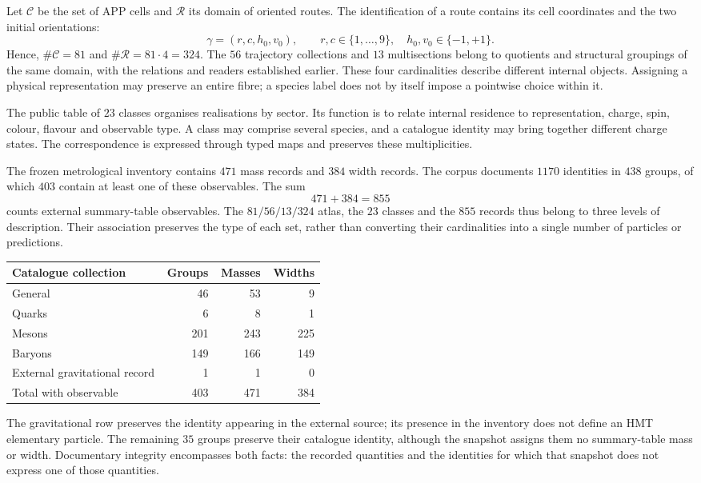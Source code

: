 Let \(\mathcal C\) be the set of APP cells and \(\mathcal R\) its domain
of oriented routes. The identification of a route contains its cell
coordinates and the two initial orientations:
\[
 \gamma=(r,c,h_0,v_0),\qquad
 r,c\in\{1,\ldots,9\},\quad h_0,v_0\in\{-1,+1\}.
\]
Hence, \(\#\mathcal C=81\) and \(\#\mathcal R=81\cdot4=324\).
The \(56\) trajectory collections and \(13\) multisections belong
to quotients and structural groupings of the same domain, with the
relations and readers established earlier. These four cardinalities
describe different internal objects. Assigning a physical
representation may preserve an entire fibre; a species label does not
by itself impose a pointwise choice within it.

The public table of \(23\) classes organises realisations by sector.
Its function is to relate internal residence to representation,
charge, spin, colour, flavour and observable type. A class may
comprise several species, and a catalogue identity may bring together
different charge states. The correspondence is expressed through
typed maps and preserves these multiplicities.

The frozen metrological inventory contains \(471\) mass records and
\(384\) width records. The corpus documents \(1170\) identities in \(438\)
groups, of which \(403\) contain at least one of these observables.
The sum
\[
 471+384=855
\]
counts external summary-table observables. The \(81/56/13/324\) atlas,
the \(23\) classes and the \(855\) records thus belong to three levels
of description. Their association preserves the type of each set, rather
than converting their cardinalities into a single number of particles or predictions.

\begin{center}
\begin{tabular}{p{0.49\linewidth}rrr}
\toprule
Catalogue collection & Groups & Masses & Widths\\
\midrule
General & 46 & 53 & 9\\
Quarks & 6 & 8 & 1\\
Mesons & 201 & 243 & 225\\
Baryons & 149 & 166 & 149\\
External gravitational record & 1 & 1 & 0\\
\midrule
Total with observable & 403 & 471 & 384\\
\bottomrule
\end{tabular}
\end{center}

The gravitational row preserves the identity appearing in the external source;
its presence in the inventory does not define an HMT elementary particle.
The remaining \(35\) groups preserve their catalogue identity, although
the snapshot assigns them no summary-table mass or width. Documentary
integrity encompasses both facts: the recorded quantities and the identities
for which that snapshot does not express one of those quantities.

